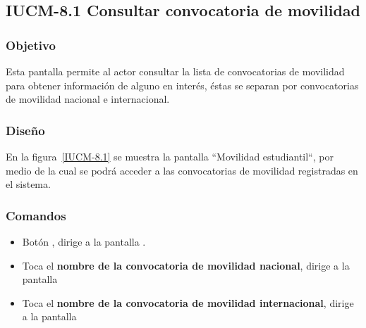 \subsection{IUCM-8.1 Consultar convocatoria de movilidad}
 
\subsubsection{Objetivo}

Esta pantalla permite al actor  consultar la lista de convocatorias de movilidad para obtener información de alguno en interés, éstas se separan por convocatorias de movilidad nacional e internacional.
\subsubsection{Diseño}

En la figura~\ref{IUCM-8.1} se muestra la pantalla ``Movilidad estudiantil“, por medio de la cual se podrá acceder a las convocatorias de movilidad registradas en el sistema. \\


\subsubsection{Comandos}
\begin{itemize}
	\item Botón , dirige a la pantalla .
	\item Toca el \textbf{nombre de la convocatoria de movilidad nacional}, dirige a la pantalla 
	\item Toca el \textbf{nombre de la convocatoria de movilidad internacional}, dirige a la pantalla 
\end{itemize}
